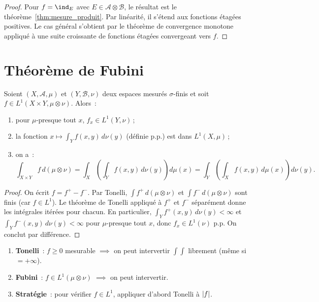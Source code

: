 \begin{proof}
Pour $f = \ind_E$ avec $E \in \mathcal{A} \otimes \mathcal{B}$, le r\'esultat est le
th\'eor\`eme~\ref{thm:mesure_produit}. Par lin\'earit\'e, il s'\'etend aux fonctions
\'etag\'ees positives. Le cas g\'en\'eral s'obtient par le th\'eor\`eme de convergence
monotone appliqu\'e \`a une suite croissante de fonctions \'etag\'ees convergeant vers $f$.
\end{proof}

\section{Th\'eor\`eme de Fubini}

\begin{theoreme}[Fubini]
\label{thm:fubini}
Soient $(X, \mathcal{A}, \mu)$ et $(Y, \mathcal{B}, \nu)$ deux espaces mesur\'es
$\sigma$-finis et soit $f \in L^1(X \times Y, \mu \otimes \nu)$. Alors~:
\begin{enumerate}
    \item[(i)] pour $\mu$-presque tout $x$, $f_x \in L^1(Y, \nu)$\,;
    \item[(ii)] la fonction $x \mapsto \int_Y f(x,y)\, d\nu(y)$ (d\'efinie p.p.)
    est dans $L^1(X, \mu)$\,;
    \item[(iii)] on a~:
    \[
        \int_{X \times Y} f\, d(\mu \otimes \nu)
        = \int_X \left(\int_Y f(x,y)\, d\nu(y)\right) d\mu(x)
        = \int_Y \left(\int_X f(x,y)\, d\mu(x)\right) d\nu(y).
    \]
\end{enumerate}
\end{theoreme}

\begin{proof}
On \'ecrit $f = f^+ - f^-$. Par Tonelli, $\int f^+\, d(\mu \otimes \nu)$ et
$\int f^-\, d(\mu \otimes \nu)$ sont finis (car $f \in L^1$). Le th\'eor\`eme de Tonelli
appliqu\'e \`a $f^+$ et $f^-$ s\'epar\'ement donne les int\'egrales it\'er\'ees pour chacun.
En particulier, $\int_Y f^+(x,y)\, d\nu(y) < \infty$ et
$\int_Y f^-(x,y)\, d\nu(y) < \infty$ pour $\mu$-presque tout $x$, donc
$f_x \in L^1(\nu)$ p.p. On conclut par diff\'erence.
\end{proof}

\begin{formules}[title=\textbf{Fubini-Tonelli~: mode d'emploi}]
\begin{enumerate}
    \item \textbf{Tonelli}~: $f \geq 0$ mesurable $\implies$ on peut intervertir
    $\int\int$ librement (m\^eme si $= +\infty$).
    \item \textbf{Fubini}~: $f \in L^1(\mu \otimes \nu)$ $\implies$ on peut intervertir.
    \item \textbf{Strat\'egie}~: pour v\'erifier $f \in L^1$, appliquer d'abord Tonelli
    \`a $\left| f \right|$.
\end{enumerate}
\end{formules}

